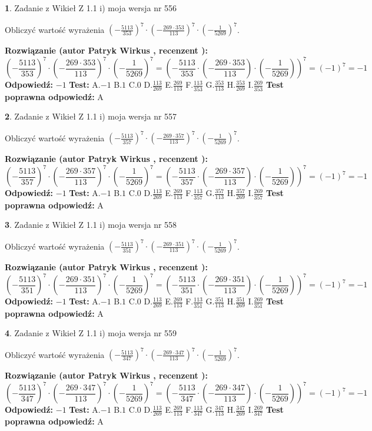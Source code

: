 \documentclass[12pt, a4paper]{article}
\theoremstyle{definition} %
\newtheorem{zad}{}
\newcommand{\zadStart}[1]{\begin{zad}#1\newline}
\newcommand{\zadStop}{\end{zad}}
\newcommand{\rozwStart}[2]{\noindent \textbf{Rozwiązanie (autor #1 , recenzent #2): }\newline}
\newcommand{\rozwStop}{\newline}
\newcommand{\odpStart}{\noindent \textbf{Odpowiedź:}\newline}
\newcommand{\odpStop}{\newline}
\newcommand{\testStart}{\noindent \textbf{Test:}\newline}
\newcommand{\testStop}{\newline}
\newcommand{\kluczStart}{\noindent \textbf{Test poprawna odpowiedź:}\newline}
\newcommand{\kluczStop}{\newline}
\begin{document}
\zadStart{Zadanie z Wikieł Z 1.1 i) moja wersja nr 556}

Obliczyć wartość wyrażenia $(-\frac{5113}{353})^{7} \cdot (-\frac{269 \cdot 353}{113})^{7} \cdot (-\frac{1}{5269})^{7}$.
\zadStop
\rozwStart{Patryk Wirkus}{}
$$(-\frac{5113}{353})^{7} \cdot (-\frac{269 \cdot 353}{113})^{7} \cdot (-\frac{1}{5269})^{7} = (-\frac{5113}{353} \cdot (-\frac{269 \cdot 353}{113}) \cdot (-\frac{1}{5269}))^{7} = (-1)^{7} = -1$$
\rozwStop
\odpStart
$-1$
\odpStop
\testStart
A.$-1$ B.$1$ C.$0$ D.$\frac{113}{269}$ E.$\frac{269}{113}$
F.$\frac{113}{353}$ G.$\frac{353}{113}$
H.$\frac{353}{269}$
I.$\frac{269}{353}$
\testStop
\kluczStart
A
\kluczStop



\zadStart{Zadanie z Wikieł Z 1.1 i) moja wersja nr 557}

Obliczyć wartość wyrażenia $(-\frac{5113}{357})^{7} \cdot (-\frac{269 \cdot 357}{113})^{7} \cdot (-\frac{1}{5269})^{7}$.
\zadStop
\rozwStart{Patryk Wirkus}{}
$$(-\frac{5113}{357})^{7} \cdot (-\frac{269 \cdot 357}{113})^{7} \cdot (-\frac{1}{5269})^{7} = (-\frac{5113}{357} \cdot (-\frac{269 \cdot 357}{113}) \cdot (-\frac{1}{5269}))^{7} = (-1)^{7} = -1$$
\rozwStop
\odpStart
$-1$
\odpStop
\testStart
A.$-1$ B.$1$ C.$0$ D.$\frac{113}{269}$ E.$\frac{269}{113}$
F.$\frac{113}{357}$ G.$\frac{357}{113}$
H.$\frac{357}{269}$
I.$\frac{269}{357}$
\testStop
\kluczStart
A
\kluczStop



\zadStart{Zadanie z Wikieł Z 1.1 i) moja wersja nr 558}

Obliczyć wartość wyrażenia $(-\frac{5113}{351})^{7} \cdot (-\frac{269 \cdot 351}{113})^{7} \cdot (-\frac{1}{5269})^{7}$.
\zadStop
\rozwStart{Patryk Wirkus}{}
$$(-\frac{5113}{351})^{7} \cdot (-\frac{269 \cdot 351}{113})^{7} \cdot (-\frac{1}{5269})^{7} = (-\frac{5113}{351} \cdot (-\frac{269 \cdot 351}{113}) \cdot (-\frac{1}{5269}))^{7} = (-1)^{7} = -1$$
\rozwStop
\odpStart
$-1$
\odpStop
\testStart
A.$-1$ B.$1$ C.$0$ D.$\frac{113}{269}$ E.$\frac{269}{113}$
F.$\frac{113}{351}$ G.$\frac{351}{113}$
H.$\frac{351}{269}$
I.$\frac{269}{351}$
\testStop
\kluczStart
A
\kluczStop



\zadStart{Zadanie z Wikieł Z 1.1 i) moja wersja nr 559}

Obliczyć wartość wyrażenia $(-\frac{5113}{347})^{7} \cdot (-\frac{269 \cdot 347}{113})^{7} \cdot (-\frac{1}{5269})^{7}$.
\zadStop
\rozwStart{Patryk Wirkus}{}
$$(-\frac{5113}{347})^{7} \cdot (-\frac{269 \cdot 347}{113})^{7} \cdot (-\frac{1}{5269})^{7} = (-\frac{5113}{347} \cdot (-\frac{269 \cdot 347}{113}) \cdot (-\frac{1}{5269}))^{7} = (-1)^{7} = -1$$
\rozwStop
\odpStart
$-1$
\odpStop
\testStart
A.$-1$ B.$1$ C.$0$ D.$\frac{113}{269}$ E.$\frac{269}{113}$
F.$\frac{113}{347}$ G.$\frac{347}{113}$
H.$\frac{347}{269}$
I.$\frac{269}{347}$
\testStop
\kluczStart
A
\kluczStop
\end{document}
